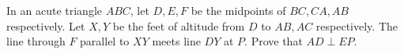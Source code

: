 In an acute triangle $ABC$, let $D,E,F$ be the midpoints of $BC,CA,AB$ respectively. Let $X,Y$ be the feet of altitude from $D$ to $AB,AC$ respectively. The line through $F$ parallel to $XY$ meets line $DY$ at $P$. Prove that $AD\perp EP$.
